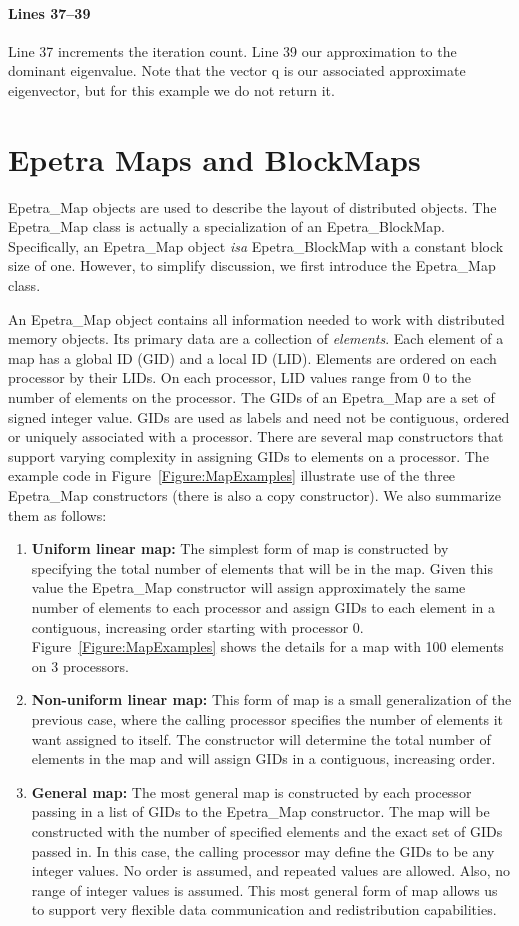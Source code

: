 \documentclass[12pt,relax]{EpetraUserGuide}
\newcommand{\map}{Epetra\_Map}
\newcommand{\blockmap}{Epetra\_BlockMap}
\begin{document}
\paragraph{Lines 37--39}
Line 37 increments the iteration count.  Line 39 our approximation to
the dominant eigenvalue.  Note that the vector q is our associated
approximate eigenvector, but for this example we do not return it.

\section{Epetra Maps and BlockMaps}

\map{} objects are used to describe the layout of distributed
objects.  The \map{} class is actually a specialization of an
\blockmap{}.  Specifically, an \map{} object {\it isa} \blockmap{}
with a constant block size of one.  However, to simplify discussion,
we first introduce the \map{} class.

An \map{} object contains all information needed to work with
distributed memory objects.  Its primary data are a collection of {\it
elements}.  Each element of a map has a global ID (GID) and a local ID
(LID).  Elements are ordered on each processor by their LIDs.  On each
processor, LID values range from 0 to the number of elements on the 
processor.  The GIDs
of an \map{} are a set of signed integer value.  GIDs are used as
labels and need not be contiguous, ordered or uniquely associated with
a processor.  There are several map constructors that support varying
complexity in assigning GIDs to elements on a processor.  The example
code in Figure~\ref{Figure:MapExamples} illustrate use of the three
\map{} constructors (there is also a copy constructor).  We also
summarize them as follows:
\begin{enumerate}
\item {\bf Uniform linear map:}  The simplest form of map is
constructed by specifying the total number of elements that will be in
the map.  Given this value the \map{} constructor will assign
approximately the same number of elements to each processor and assign
GIDs to each element in a contiguous, increasing order starting with
processor 0.  Figure~\ref{Figure:MapExamples} shows the details for a
map with 100 elements on 3 processors.
\item {\bf Non-uniform linear map:}  This form of map is a small
generalization of the previous case, 
where the calling processor specifies the number of
elements it want assigned to itself.  The constructor will determine
the total number of elements in the map and will assign GIDs in a
contiguous, increasing order.
\item {\bf General map:} The most general map is constructed by each
processor passing in a list of GIDs to the \map{} constructor.  The
map will be constructed with the number of specified elements and the
exact set of GIDs passed in.  In this case, the calling processor may
define the GIDs to be any integer values.  No order is assumed, and
repeated values are allowed.  Also, no range of integer values is
assumed.  This most general form of map allows us to support very
flexible data communication and redistribution capabilities.
\end{enumerate}
\end{document}

